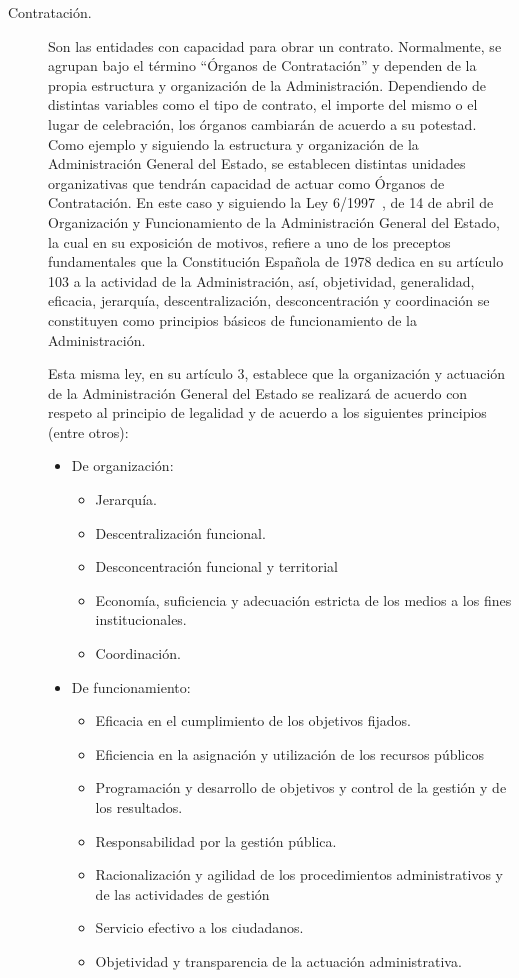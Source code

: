 \begin{description}
 \item [Contratación.] Son las entidades con capacidad para obrar un contrato. Normalmente,
se agrupan bajo el término ``Órganos de Contratación'' y dependen de la propia estructura y organización
de la Administración. Dependiendo de distintas variables como el tipo de contrato, el importe del 
mismo o el lugar de celebración, los órganos cambiarán de acuerdo a su potestad. Como ejemplo y siguiendo
la estructura y organización de la Administración General del Estado, se establecen distintas unidades
organizativas que tendrán capacidad de actuar como Órganos de Contratación. En este caso y siguiendo 
la Ley 6/1997~\cite{l6-1997}, de 14 de abril de Organización y Funcionamiento de la Administración 
General del Estado, la cual en su exposición de motivos, refiere a uno de los preceptos fundamentales
que la Constitución Española de 1978 dedica en su artículo 103 a la actividad de la Administración, así, objetividad,
generalidad, eficacia, jerarquía, descentralización, desconcentración y coordinación se constituyen como principios básicos 
de funcionamiento de la Administración.

Esta misma ley, en su artículo 3, establece que la organización y actuación de la Administración General del Estado se realizará de acuerdo 
con respeto al principio de legalidad y de acuerdo a los siguientes principios (entre otros):
\begin{itemize}
 \item De organización:
\begin{itemize}
 \item Jerarquía.
 \item Descentralización funcional.
 \item Desconcentración funcional y territorial
 \item Economía, suficiencia y adecuación estricta de los medios a los fines institucionales.
 \item Coordinación.
\end{itemize}
 \item De funcionamiento: 
\begin{itemize}
\item Eficacia en el cumplimiento de los objetivos fijados.
\item Eficiencia en la asignación y utilización de los recursos públicos
\item Programación y desarrollo de objetivos y control de la gestión y de los resultados.
\item Responsabilidad por la gestión pública.
\item Racionalización y agilidad de los procedimientos administrativos y de las actividades de gestión
\item Servicio efectivo a los ciudadanos.
\item Objetividad y transparencia de la actuación administrativa.
\end{itemize}
\end{itemize} 


\end{description}
